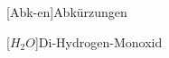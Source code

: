 \begin{acronym}[DHBW]
 [Abk-en]{Abkürzungen}


 [\ensuremath{H_2O}]{Di-Hydrogen-Monoxid}

\end{acronym}
